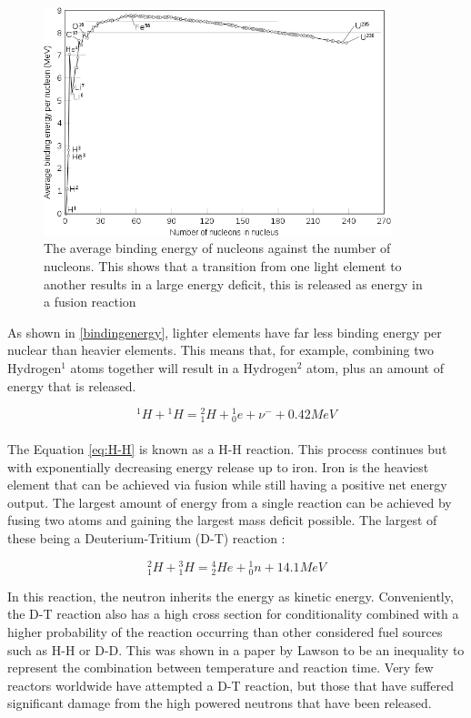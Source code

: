 \documentclass[12pt,a4paper,oneside]{report}
\begin{document}
\begin{figure}[H]
\includegraphics[width=0.9\textwidth, center]{Images/Bindingenergy.png}
\caption{The average binding energy of nucleons against the number of nucleons. This shows that a transition from one light element to another results in a large energy deficit, this is released as energy in a fusion reaction \cite{Fastfission2008BindingNucleon}}
\label{bindingenergy}
\end{figure}

As shown in \autoref{bindingenergy}, lighter elements have far less binding energy per nuclear than heavier elements. This means that, for example, combining two Hydrogen$^{1}$ atoms together will result in a Hydrogen$^{2}$ atom, plus an amount of energy that is released.

\begin{equation}
{^{1}H} + {^{1}H} = {^{2}_{1}H} + {^{1}_{0}e} + {\nu}^{-} + 0.42MeV
\label{eq:H-H}
\end{equation}
\\
The Equation \ref{eq:H-H} is known as a H-H reaction. This process continues but with exponentially decreasing energy release up to iron. Iron is the heaviest element that can be achieved via fusion while still having a positive net energy output. The largest amount of energy from a single reaction can be achieved by fusing two atoms and gaining the largest mass deficit possible. The largest of these being a Deuterium-Tritium (D-T) reaction \cite[p. 430]{Shultis2016FundamentalsEdition.}:

\begin{equation}
{^{2}_{1}H} + {^{3}_{1}H} = {^{4}_{2}He} + {^{1}_{0}n} + 14.1MeV
\label{eq:D-T}
\end{equation}

In this reaction, the neutron inherits the energy as kinetic energy. Conveniently, the D-T reaction also has a high cross section for conditionality combined with a higher probability of the reaction occurring than other considered fuel sources such as H-H or D-D. This was shown in a paper by Lawson \cite{Christopherson1957SomeReactor} to be an inequality to represent the combination between temperature and reaction time. Very few reactors worldwide have attempted a D-T reaction, but those that have suffered significant damage from the high powered neutrons that have been released.
\end{document}
